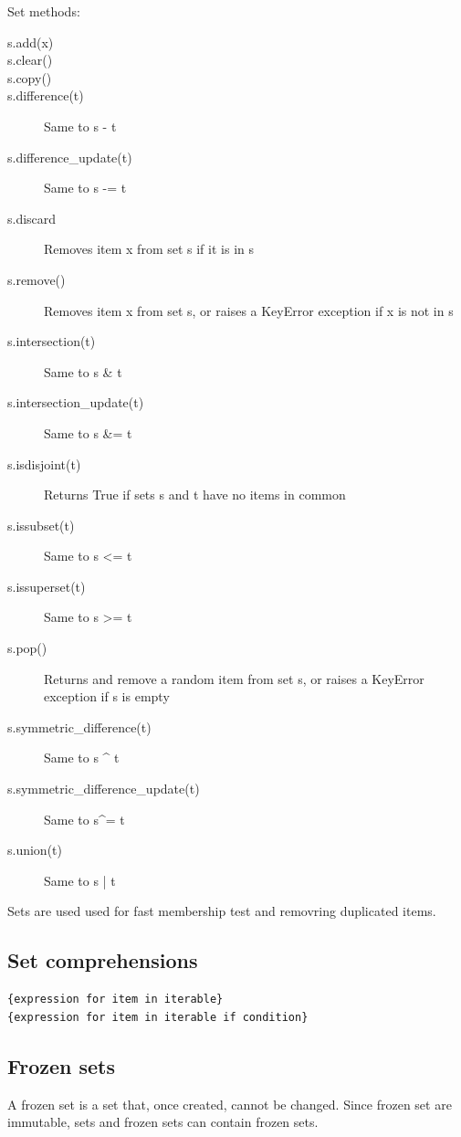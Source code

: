 Set methods:
\begin{description}
\item[s.add(x)] 
\item[s.clear()] 
\item[s.copy()] 
\item[s.difference(t)] Same to s - t
\item[s.difference\_{}update(t)] Same to s -= t
\item[s.discard] Removes item x from set s if it is in s
\item[s.remove()] Removes item x from set s, or raises a KeyError exception if x is not in s
\item[s.intersection(t)] Same to s \& t
\item[s.intersection\_{}update(t)] Same to s \&= t
\item[s.isdisjoint(t)] Returns True if sets s and t have no items in common
\item[s.issubset(t)] Same to s <= t
\item[s.issuperset(t)] Same to s >= t
\item[s.pop()] Returns and remove a random item from set s, or raises a KeyError exception if s is empty
\item[s.symmetric\_{}difference(t)] Same to s \^{} t
\item[s.symmetric\_{}difference\_{}update(t)] Same to s\^{}= t
\item[s.union(t)] Same to s | t
\end{description}


Sets are used used for fast membership test and removring duplicated items.


\subsection{Set comprehensions}

\begin{verbatim}
{expression for item in iterable}
{expression for item in iterable if condition}
\end{verbatim}

\subsection{Frozen sets}

A frozen set is a set that, once created, cannot be changed.
Since frozen set are immutable, sets and frozen sets can contain frozen sets.




